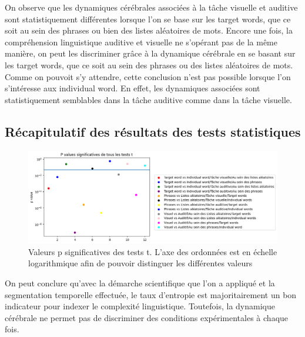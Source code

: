 On observe que les dynamiques cérébrales associées à la tâche visuelle et auditive sont statistiquement différentes lorsque l'on se base sur les target words, que ce soit au sein des phrases ou bien des listes aléatoires de mots. Encore une fois, la compréhension linguistique auditive et visuelle ne s'opérant pas de la même manière, on peut les discriminer grâce à la dynamique cérébrale en se basant sur les target words, que ce soit au sein des phrases ou des listes aléatoires de mots. Comme on pouvoit s'y attendre, cette conclusion n'est pas possible lorsque l'on s'intéresse aux individual word. En effet, les dynamiques associées sont statistiquement semblables dans la tâche auditive comme dans la tâche visuelle.

\subsection{Récapitulatif des résultats des tests statistiques}

\begin{figure}[!ht]
    \centering
    \includegraphics[width=15cm]{p_value_significative.png}
    \caption{Valeurs p significatives des tests t. L'axe des ordonnées est en échelle logarithmique afin de pouvoir distinguer les différentes valeurs}
    \label{fig6.4}
\end{figure}

On peut conclure qu'avec la démarche scientifique que l'on a appliqué et la segmentation temporelle effectuée, le taux d'entropie est majoritairement un bon indicateur pour indexer le complexité linguistique. Toutefois, la dynamique cérébrale ne permet pas de discriminer des conditions expérimentales à chaque fois.
